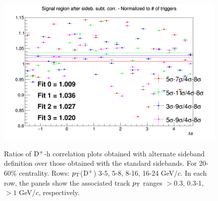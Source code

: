 \begin{figure}
{\includegraphics[width=0.31\linewidth]{Centrality_DPlus/Dplus/Systematic/20_60/Side_band_20_60/Ratio_AzimCorrDistr_Dplus_Canvas_PtIntBins11to11_PoolInt_thr1dotto99dot.png}} \\
 \caption{Ratios of ${\rm D^+}$-h correlation plots obtained with alternate sideband definition over those obtained with the standard sidebands. For 20-60\% centrality. Rows: $p_{\rm T}$(${\rm D^+}$) 3-5, 5-8, 8-16, 16-24 GeV/$c$. In each row, the panels show the associated track $p_{\rm T}$ ranges $> 0.3$, 0.3-1, $> 1$ GeV/$c$, respectively.}
\label{fig:SysBkg2060_Dplus}
\end{figure}

